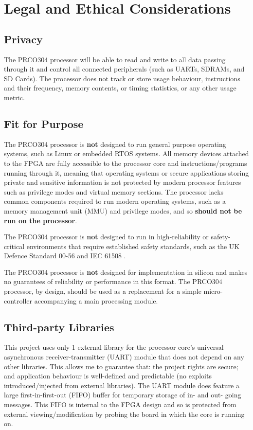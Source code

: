 \documentclass[11pt,a4paper]{report}
\newcommand{\scname}{PRCO304}
\begin{document}
\newpage
\section{Legal and Ethical Considerations}
\subsection{Privacy}
The \scname{} processor will be able to read and write to all data passing through it and control all connected peripherals (such as UARTs, SDRAMs, and SD Cards). The processor does not track or store usage behaviour, instructions and their frequency,   memory contents, or timing statistics, or any other usage metric.

\subsection{Fit for Purpose}
The \scname{} processor is \textbf{not} designed to run general purpose operating systems, such as Linux or embedded RTOS systems. All memory devices attached to the FPGA are fully accessible to the processor core and instructions/programs running through it, meaning that operating systems or secure applications storing private and sensitive information is not protected by modern processor features such as privilege modes and virtual memory sections. The processor lacks common components required to run modern operating systems, such as a memory management unit (MMU) and privilege modes, and so \textbf{should not be run on the processor}.

The \scname{} processor is \textbf{not} designed to run in high-reliability or safety-critical environments that require established safety standards, such as the UK Defence Standard 00-56 \cite{defstan_0056_2} and IEC 61508 \cite{iec61508}.

The \scname{} processor is \textbf{not} designed for implementation in silicon and makes no guarantees of reliability or performance in this format.
\newline\newline
The \scname{} processor, by design, should be used as a replacement for a simple micro-controller accompanying a main processing module.

\subsection{Third-party Libraries}
This project uses only 1 external library for the processor core's universal asynchronous receiver-transmitter (UART) module that does not depend on any other libraries. This allows me to guarantee that: the project rights are secure; and application behaviour is well-defined and predictable (no exploits introduced/injected from external libraries). The UART module does feature a large first-in-first-out (FIFO) buffer for temporary storage of in- and out- going messages. This FIFO is internal to the FPGA design and so is protected from external viewing/modification by probing the board in which the core is running on.
\end{document}
